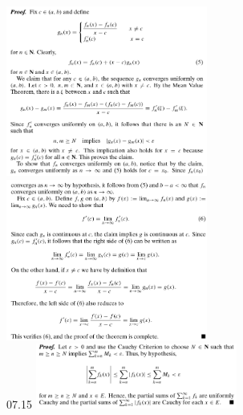 \documentclass[8pt,landscape]{article}
\begin{document}
\begin{multicols}{3}
    \includegraphics[width=250]{07_12a.png} \\
    \includegraphics[width=250]{07_12b.png} \\
    07.15
    \includegraphics[width=250]{07_15.png} \\

\end{multicols}
\end{document}
